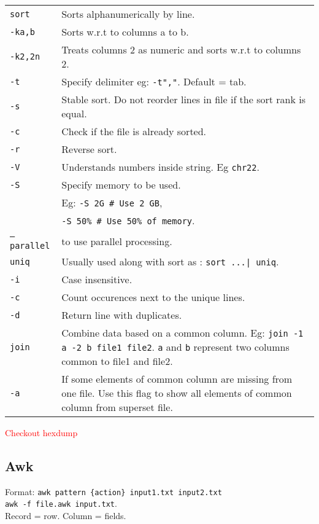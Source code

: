 \begin{tabularx}{\linewidth}{lX}
\texttt{sort} & Sorts alphanumerically by line.\\
\texttt{-ka,b} & Sorts w.r.t to columns a to b.\\
\texttt{-k2,2n} & Treats columns 2 as numeric and sorts w.r.t to columns 2.\\
\texttt{-t} & Specify delimiter eg: \texttt{-t","}. Default = tab.\\
\texttt{-s} & Stable sort. Do not reorder lines in file if the sort rank is equal.\\
\texttt{-c} & Check if the file is already sorted. \\
\texttt{-r} & Reverse sort.\\
\texttt{-V} & Understands numbers inside string. Eg \texttt{chr22}.\\
\texttt{-S} & Specify memory to be used. \\
 & Eg: \texttt{-S 2G \# Use 2 GB}, \\ 
 & \hspace{13pt} \texttt{-S 50\% \# Use 50\% of memory}. \\
\texttt{--parallel} & to use parallel processing.\\
\hline
\texttt{uniq} & Usually used along with sort as : \texttt{sort ...| uniq}.\\
\texttt{-i} & Case insensitive.\\
\texttt{-c} & Count occurences next to the unique lines.\\
\texttt{-d} & Return line with duplicates.\\
\hline
\texttt{join} & Combine data based on a common column. Eg: \texttt{join -1 a -2 b file1 file2}. \texttt{a} and \texttt{b} represent two columns common to file1 and file2. \\
\texttt{-a} & If some elements of common column are missing from one file. Use this flag to show all elements of common column from superset file. \\
\hline

\end{tabularx}

\textcolor{red}{Checkout hexdump}

\subsection{Awk}

Format: \texttt{awk pattern \{action\} input1.txt input2.txt} \\ \texttt{awk -f file.awk input.txt}.\\ Record = row. Column = fields. \\

